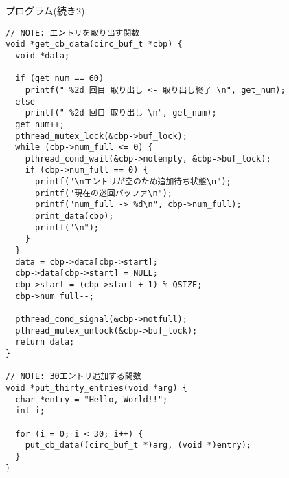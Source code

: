 \documentclass[10pt]{jarticle}
\begin{document}
\begin{itembox}[l]{プログラム(続き2)}
  \begin{verbatim}
// NOTE: エントリを取り出す関数
void *get_cb_data(circ_buf_t *cbp) {
  void *data;

  if (get_num == 60)
    printf(" %2d 回目 取り出し <- 取り出し終了 \n", get_num);
  else
    printf(" %2d 回目 取り出し \n", get_num);
  get_num++;
  pthread_mutex_lock(&cbp->buf_lock);
  while (cbp->num_full <= 0) {
    pthread_cond_wait(&cbp->notempty, &cbp->buf_lock);
    if (cbp->num_full == 0) {
      printf("\nエントリが空のため追加待ち状態\n");
      printf("現在の巡回バッファ\n");
      printf("num_full -> %d\n", cbp->num_full);
      print_data(cbp);
      printf("\n");
    }
  }
  data = cbp->data[cbp->start];
  cbp->data[cbp->start] = NULL;
  cbp->start = (cbp->start + 1) % QSIZE;
  cbp->num_full--;

  pthread_cond_signal(&cbp->notfull);
  pthread_mutex_unlock(&cbp->buf_lock);
  return data;
}

// NOTE: 30エントリ追加する関数
void *put_thirty_entries(void *arg) {
  char *entry = "Hello, World!!";
  int i;

  for (i = 0; i < 30; i++) {
    put_cb_data((circ_buf_t *)arg, (void *)entry);
  }
}
  \end{verbatim}
\end{itembox}
\end{document}
